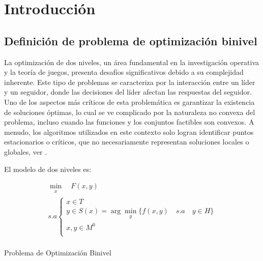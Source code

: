 \chapter{Introducción}
\section{Definición de problema de optimización binivel}
La optimización de dos niveles, un área fundamental en la investigación operativa y la teoría de juegos, presenta desafíos significativos debido a su complejidad inherente. Este tipo de problemas se caracteriza por la interacción entre un líder y un seguidor, donde las decisiones del líder afectan las respuestas del seguidor. Uno de los aspectos más críticos de esta problemática es garantizar la existencia de soluciones óptimas, lo cual se ve complicado por la naturaleza no convexa del problema, incluso cuando las funciones y los conjuntos factibles son convexos. A menudo, los algoritmos utilizados en este contexto solo logran identificar puntos estacionarios o críticos, que no necesariamente representan soluciones locales o globales, ver \cite{DempeyZemkoho2020}.


El modelo de dos niveles es:

\begin{table}[H]

    \[\begin{array}{l}
        \underset{\substack{x}}{\min} \quad F(x, y)\\
        s.a \left\{ \begin{array}{l}
            x \in T \\
             y \in S(x) = \arg  \underset{\substack{y}}{\min} \{ f(x, y) \quad s.a \quad y \in  H \}\\
            x,y \in M^0 \\
        \end{array}\right.
        \tag{\theequation}
        \label{eq:Def1Binivel}
    \end{array}\]\\


    \caption*{Problema de Optimización Binivel}
    \end{table}

